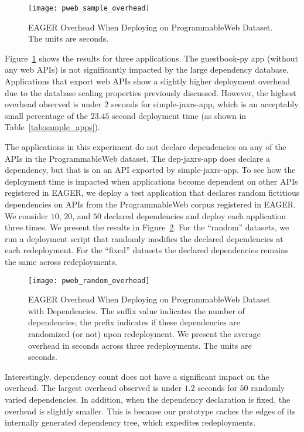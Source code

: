 \begin{figure}
\centering
\texttt{[image: pweb\_sample\_overhead]}
\caption{EAGER Overhead When Deploying on ProgrammableWeb Dataset.  The units
are seconds.}
\label{fig:pweb_sample_overhead}
\end{figure}

Figure~\ref{fig:pweb_sample_overhead} shows the results for three applications. The guestbook-py app
(without any web APIs) is not significantly impacted by the large dependency database. 
Applications that export web APIs show a slightly higher deployment overhead
due to the database scaling properties previously discussed. 
However, the highest overhead observed is under $2$ seconds for
simple-jaxrs-app, which is an 
acceptably small percentage of the $23.45$ second deployment time (as shown in
Table~\ref{tab:sample_apps}).

The applications in this experiment do not declare dependencies on any of the APIs 
in the ProgrammableWeb dataset. The dep-jaxrs-app does declare a dependency, 
but that is on an API exported by 
simple-jaxrs-app. To see how the deployment time is impacted
when applications become dependent on other APIs registered in EAGER, we
deploy a test application that declares random fictitious dependencies on APIs
from the ProgrammableWeb corpus registered in EAGER.  We consider 
$10$, $20$, and $50$ declared dependencies and deploy each
application three times.
We present the results in Figure~\ref{fig:pweb_random_overhead}.
For the ``random'' datasets, we
run a deployment script that randomly modifies the 
declared dependencies at each redeployment. For the 
``fixed'' datasets the declared dependencies remains the same across
redeployments.

\begin{figure}
\centering
\texttt{[image: pweb\_random\_overhead]}
\caption{EAGER Overhead When Deploying on ProgrammableWeb Dataset with
Dependencies. The suffix value indicates the number of dependencies;
the prefix indicates if these dependencies are randomized (or not) upon
redeployment.  We present the average overhead in seconds across three
redeployments.  The units are seconds.
\label{fig:pweb_random_overhead}
}
\end{figure}


Interestingly, dependency count does not have a significant impact on 
the overhead.  The largest overhead observed is under $1.2$ seconds
for $50$ randomly varied dependencies.
In addition, when the dependency declaration is fixed, the overhead is slightly smaller. 
This is because our prototype caches the edges of its internally generated dependency tree, 
which expedites redeployments.

